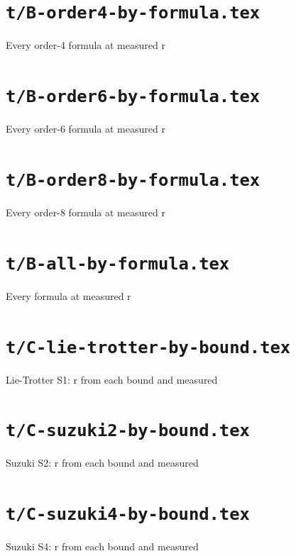 \documentclass{article}
\begin{document}
\section*{\texttt{t/B-order4-by-formula.tex}}
Every order-4 formula at measured r\par\medskip

\clearpage

\section*{\texttt{t/B-order6-by-formula.tex}}
Every order-6 formula at measured r\par\medskip

\clearpage

\section*{\texttt{t/B-order8-by-formula.tex}}
Every order-8 formula at measured r\par\medskip

\clearpage

\section*{\texttt{t/B-all-by-formula.tex}}
Every formula at measured r\par\medskip

\clearpage

\section*{\texttt{t/C-lie-trotter-by-bound.tex}}
Lie-Trotter S1: r from each bound and measured\par\medskip

\clearpage

\section*{\texttt{t/C-suzuki2-by-bound.tex}}
Suzuki S2: r from each bound and measured\par\medskip

\clearpage

\section*{\texttt{t/C-suzuki4-by-bound.tex}}
Suzuki S4: r from each bound and measured\par\medskip

\clearpage
\end{document}

